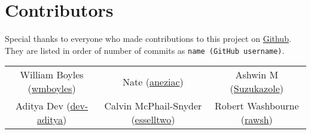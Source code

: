 \section{Contributors}
Special thanks to everyone who made contributions to this project on \href{https://github.com/wmboyles/Math-Summaries}{Github}.
They are listed in order of number of commits as \texttt{name (GitHub username)}.

\begin{center}
    \begin{tabular}{ c c c }
    	William Boyles (\href{https://github.com/wmboyles}{wmboyles}) & Nate (\href{https://github.com/aneziac}{aneziac}) & Ashwin M  (\href{https://github.com/Suzukazole}{Suzukazole}) \\
		Aditya Dev (\href{https://github.com/dev-aditya}{dev-aditya}) & Calvin McPhail-Snyder (\href{https://github.com/esselltwo}{esselltwo}) & Robert Washbourne (\href{https://github.com/rawsh}{rawsh}) \\
	\end{tabular}
\end{center}
